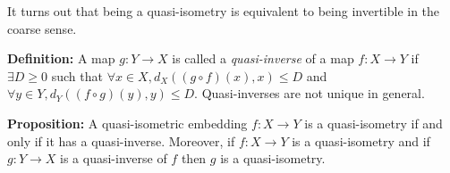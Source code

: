 \documentclass[12pt]{article}
\newcommand{\vs}{\vskip10pt}
\begin{document}
	\vs 
	
	It turns out that being a quasi-isometry is equivalent to being invertible in the coarse sense. 
	
	\vs 
	
	\textbf{Definition: } A map $g: Y \rightarrow X$ is called a \textit{quasi-inverse} of a map $f: X \rightarrow Y$ if $\exists D \geq 0$ such that $\forall x \in X, d_X((g \circ f)(x), x) \leq D$ and $\forall y \in Y, d_Y((f \circ g) (y), y) \leq D$. Quasi-inverses are not unique in general.
	
	\vs 
	
	\textbf{Proposition: } A quasi-isometric embedding $f: X \rightarrow Y$ is a quasi-isometry if and only if it has a quasi-inverse. Moreover, if $f: X \rightarrow Y$ is a quasi-isometry and if $g: Y \rightarrow X$ is a quasi-inverse of $f$ then $g$ is a quasi-isometry.
	
\end{document}
